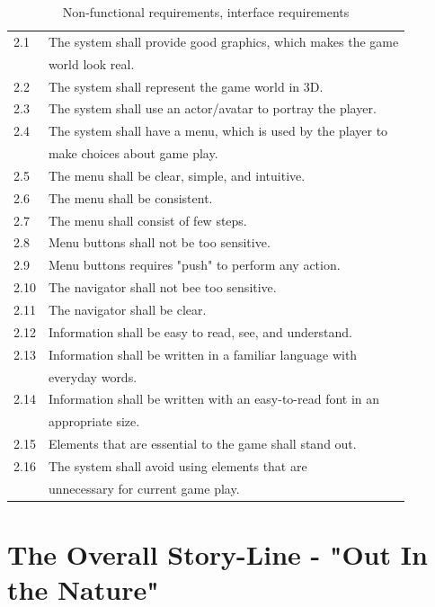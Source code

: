 \begin{table} [H]
\centering
\begin{tabular}{|>{\raggedright}p{}|p{}|} 
\hline
2.1 & The system shall provide good graphics, which makes the game \\ & world look real. \\ \hline
2.2 & The system shall represent the game world in 3D.\\ \hline
2.3 & The system shall use an actor/avatar to portray the player.\\ \hline
2.4 & The system shall have a menu, which is used by the player to \\ & make choices about game play.\\ \hline
2.5 & The menu shall be clear, simple, and intuitive.\\ \hline
2.6 & The menu shall be consistent. \\ \hline
2.7 & The menu shall consist of few steps.\\ \hline
2.8 & Menu buttons shall not be too sensitive.\\ \hline
2.9 & Menu buttons requires "push" to perform any action.\\ \hline
2.10 & The navigator shall not bee too sensitive. \\ \hline
2.11 & The navigator shall be clear.\\ \hline
2.12 & Information shall be easy to read, see, and understand.\\ \hline
2.13 & Information shall be written in a familiar language with \\ & everyday words.  \\ \hline
2.14 & Information shall be written with an easy-to-read font in an \\ & appropriate size. \\ \hline
2.15 & Elements that are essential to the game shall stand out.\\ \hline
2.16 & The system shall avoid using elements that are \\ & unnecessary for current game play.\\ \hline
\end{tabular}
\caption[Non-functional requirements]{Non-functional requirements, interface requirements}
\label{tab:nfunc}
\end{table} 

\section{The Overall Story-Line - "Out In the Nature"}
\label{sec:outinthenature}

